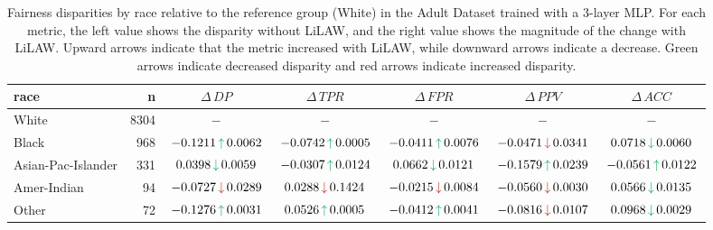 \documentclass{article}
\theoremstyle{plain}
\theoremstyle{definition}
\theoremstyle{remark}
\begin{document}
\begin{table}[h!]
\centering
\scriptsize
\setlength{\tabcolsep}{3pt}
\renewcommand{\arraystretch}{1.15}
{%
\begin{tabular}{lrccccc}
\toprule
race & n & $\Delta\,DP$ & $\Delta\,TPR$ & $\Delta\,FPR$ & $\Delta\,PPV$ & $\Delta\,ACC$\\
\midrule
White              & 8304 & $-$ & $-$ & $-$ & $-$ & $-$ \\
Black              & 968  & $\,-0.1211\,\Up\,0.0062\,$ & $\,-0.0742\,\Up\,0.0005\,$ & $\,-0.0411\,\Up\,0.0076\,$ & $\,-0.0471\,\Down\,0.0341\,$ & $\,0.0718\,\Downg\,0.0060\,$\\
Asian-Pac-Islander & 331  & \hspace{1em}$\,0.0398\,\Downg\,0.0059\,$ & $\,-0.0307\,\Up\,0.0124\,$ & \hspace{1em}$\,0.0662\,\Downg\,0.0121\,$ & $\,-0.1579\,\Up\,0.0239\,$ & \hspace{-1em}$\,-0.0561\,\Up\,0.0122\,$\\
Amer-Indian%
& 94   & $\,-0.0727\,\Down\,0.0289\,$ & \hspace{1em}$\,0.0288\,\Down\,0.1424\,$ & $\,-0.0215\,\Down\,0.0084\,$ & $\,-0.0560\,\Down\,0.0030\,$ & $\,0.0566\,\Downg\,0.0135\,$\\
Other              & 72   & $\,-0.1276\,\Up\,0.0031\,$ & \hspace{1em}$\,0.0526\,\Up\,0.0005\,$ & $\,-0.0412\,\Up\,0.0041\,$ & $\,-0.0816\,\Down\,0.0107\,$ & $\,0.0968\,\Downg\,0.0029\,$\\
\bottomrule
\end{tabular}%
}
\caption{Fairness disparities by race relative to the reference group (White) in the Adult Dataset trained with a 3-layer MLP. For each metric, the left value shows the disparity without LiLAW, and the right value shows the magnitude of the change with LiLAW. Upward arrows indicate that the metric increased with LiLAW, while downward arrows indicate a decrease. Green arrows indicate decreased disparity and red arrows indicate increased disparity.}
\label{tab:race}
\end{table}
\end{document}
